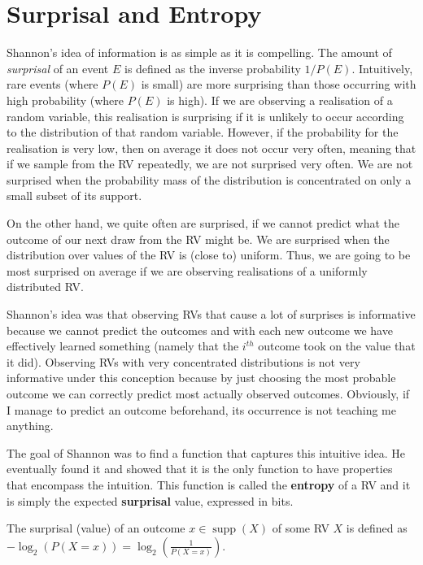 \documentclass[11pt,leqno,a4paper]{report}\usepackage[]{graphicx}\usepackage[]{color}
\newcommand{\supp}{\operatorname{supp}}
\begin{document}
\section{Surprisal and Entropy}
Shannon's idea of information is as simple as it is compelling. The amount of \emph{surprisal} of an event $E$ is defined as the inverse probability $1/P(E)$. Intuitively, rare events (where $P(E)$ is small) are more surprising than those occurring with high probability (where $P(E)$ is high). If we are observing a realisation of a random variable, this realisation is surprising if it is unlikely to occur according to the distribution of that random variable. However, if the probability for the realisation is very low, then on average it does not occur very often, meaning that if we sample from the RV repeatedly, we are not surprised very often. We are not surprised when the probability mass of the distribution is concentrated on only a small subset of its support. 

On the other hand, we quite often are surprised, if we cannot predict what the outcome of our next draw from the RV might be. We are surprised when the distribution over values of the RV is (close to) uniform. Thus, we are going to be most surprised on average if we are observing realisations of a uniformly distributed RV.

Shannon's idea was that observing RVs that cause a lot of surprises is informative because we cannot predict the outcomes and with each new outcome we have effectively learned something (namely that the $ i^{th} $ outcome took on the value that it did). Observing RVs with very concentrated distributions is not very informative under this conception because by just choosing the most probable outcome we can correctly predict most actually observed outcomes. Obviously, if I manage to predict an outcome beforehand, its occurrence is not teaching me anything.

The goal of Shannon was to find a function that captures this intuitive idea. He eventually found it and showed that it is the only function to have properties that encompass the intuition. This function is called the \textbf{entropy} of a RV and it is simply the expected \textbf{surprisal} value, expressed in bits.

\begin{Definition}[Surprisal]
The surprisal (value) of an outcome $ x \in \supp(X) $ of some RV $ X
$ is defined as $ -\log_{2}(P(X=x)) = \log_2(\frac{1}{P(X=x)})$.
\end{Definition} 
\end{document}
